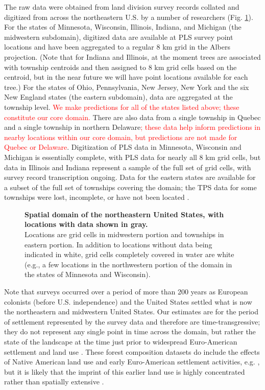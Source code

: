 \documentclass[10pt,letterpaper]{article}
\begin{document}
The raw data were obtained from land division survey records collated
and digitized from across the northeastern U.S. by a number of researchers
(Fig. \ref{fig:Spatial-domain}). For the states of Minnesota, Wisconsin,
Illinois, Indiana, and Michigan (the midwestern subdomain), digitized
data are available at PLS survey point locations and have been aggregated
to a regular 8 km grid in the Albers projection. (Note that for Indiana
and Illinois, at the moment trees are associated with township centroids
and then assigned to 8 km grid cells based on the centroid, but in
the near future we will have point locations available for each tree.)
For the states of Ohio, Pennsylvania, New Jersey, New York and the
six New England states (the eastern subdomain), data are aggregated
at the township level. \textcolor{red}{We make predictions for all
of the states listed above; these constitute our core domain. }There
are also data from a single township in Quebec and a single township
in northern Delaware\textcolor{red}{; these data help inform predictions
in nearby locations within our core domain, but predictions are not
made for Quebec or Delaware}. Digitization of PLS data in Minnesota,
Wisconsin and Michigan is essentially complete, with PLS data for
nearly all 8 km grid cells, but data in Illinois and Indiana represent
a sample of the full set of grid cells, with survey record transcription
ongoing. Data for the eastern states are available for a subset of
the full set of townships covering the domain; the TPS data for some
townships were lost, incomplete, or have not been located \cite{Cogb:etal:2002}. 

\begin{figure}

\caption{{\bf Spatial domain of the northeastern United States, with locations with
data shown in gray.} \\ Locations are grid cells in midwestern portion
and townships in eastern portion. In addition to locations without
data being indicated in white, grid cells completely covered in water
are white (e.g., a few locations in the northwestern portion of the
domain in the states of Minnesota and Wisconsin).}
\label{fig:Spatial-domain}
\end{figure}

Note that surveys occurred over a period of more than 200 years as
European colonists (before U.S. independence) and the United States
settled what is now the northeastern and midwestern United States.
Our estimates are for the period of settlement represented by the
survey data and therefore are time-transgressive; they do not represent
any single point in time across the domain, but rather the state of
the landscape at the time just prior to widespread Euro-American settlement
and land use \cite{Whit:1996,Cogb:etal:2002}. These forest composition
datasets do include the effects of Native American land use and early
Euro-American settlement activities, e.g. \cite{Blac:etal:2006},
but it is likely that the imprint of this earlier land use is highly
concentrated rather than spatially extensive \cite{munoz2014defining}.
\end{document}
